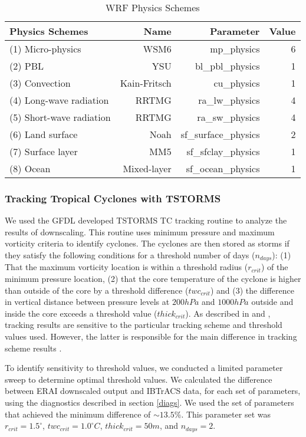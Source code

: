 \documentclass[smallextended]{svjour3}       %
\begin{document}
\begin{table}[!tbp]
\centering
\begin{tabular}{lrrr}
\toprule
             Physics Schemes &  Name & Parameter & Value \\ 
\midrule
            (1) Micro-physics &     WSM6 &  mp\_physics & 6 \\  
            (2) PBL &    YSU &  bl\_pbl\_physics &  1 \\    
            (3) Convection &   Kain-Fritsch &  cu\_physics & 1 \\    
            (4) Long-wave radiation &    RRTMG &   ra\_lw\_physics & 4 \\    
            (5) Short-wave radiation &    RRTMG &   ra\_sw\_physics & 4 \\    
            (6) Land surface &   Noah &   sf\_surface\_physics & 2 \\    
            (7) Surface layer &    MM5 &  sf\_sfclay\_physics &  1 \\    
            (8) Ocean &    Mixed-layer &  sf\_ocean\_physics &  1 \\    
\bottomrule
\end{tabular}
\caption{WRF Physics Schemes}
\label{wrf_specs}
\end{table}

\subsubsection{Tracking Tropical Cyclones with TSTORMS}
\label{tstorms}
We used the GFDL developed TSTORMS \cite{tc_algo} TC tracking routine to analyze the results of downscaling. This routine uses minimum pressure and maximum vorticity criteria to identify cyclones. The cyclones are then stored as storms if they satisfy the following conditions for a threshold number of days ($n_{days}$): (1) That the maximum vorticity location is within a threshold radius ($r_{crit}$) of the minimum pressure location, (2) that the core temperature of the cyclone is higher than outside of the core by a threshold difference ($twc_{crit}$) and (3) the difference in vertical distance between pressure levels at $200hPa$ and $1000hPa$ outside and inside the core exceeds a threshold value ($thick_{crit}$). As described in \cite{kerry_clivar} and \cite{tc_algo}, tracking results are sensitive to the particular tracking scheme and threshold values used. However, the latter is responsible for the main difference in tracking scheme results \cite{tc_track}. 
\par
To identify sensitivity to threshold values, we conducted a limited parameter sweep to determine optimal threshold values. We calculated the difference between ERAI downscaled output and IBTrACS data, for each set of parameters, using the diagnostics described in section \ref{diags}. We used the set of parameters that achieved the minimum difference of ${\sim}13.5\%$. This parameter set was $r_{crit} = 1.5^{\circ}$, $twc_{crit} = 1.0^{\circ}C$, $thick_{crit} = 50m$, and $n_{days} = 2$.  
\end{document}
